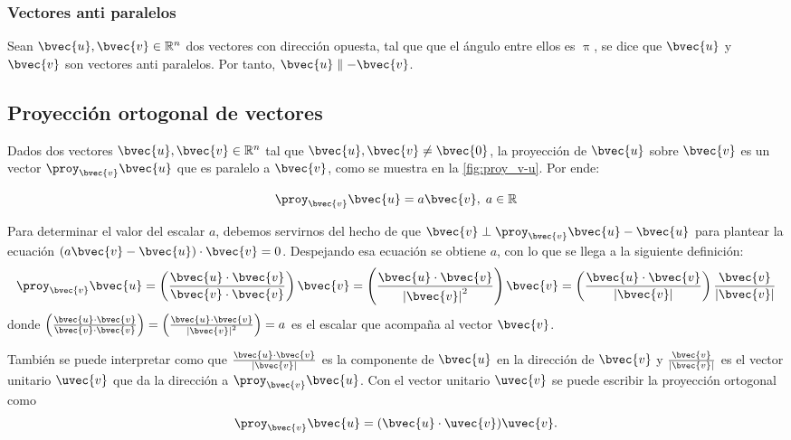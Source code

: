 \documentclass{fmbnotes}
\begin{document}
\subsubsection{ Vectores anti paralelos}

Sean \( \bvec{u}, \bvec{v} \in \mathbb{R}^{n} \) dos vectores con dirección opuesta, tal que que el ángulo entre ellos es \( \uppi \), se dice que \( \bvec{u} \) y \( \bvec{v} \) son vectores anti paralelos. Por tanto, \( \bvec{u} \parallel -\bvec{v} \).

\subsection{ Proyección ortogonal de vectores}

Dados dos vectores \( \bvec{u}, \bvec{v} \in \mathbb{R}^{n} \) tal que \( \bvec{u}, \bvec{v} \neq \bvec{0} \), la proyección de \( \bvec{u} \) sobre \( \bvec{v} \) es un vector \( \proy_{\bvec{v}} \bvec{u} \) que es paralelo a \( \bvec{v} \), como se muestra en la \autoref{fig:proy_v-u}. Por ende:

\[ \proy_{\bvec{v}} \bvec{u}=a \bvec{v}, \; a \in \mathbb{R} \]

Para determinar el valor del escalar \( a \), debemos servirnos del hecho de que \( \bvec{v} \perp \proy_{\bvec{v}} \bvec{u}-\bvec{u} \) para plantear la ecuación \( (a \bvec{v}-\bvec{u}) \cdot \bvec{v}=0 \). Despejando esa ecuación se obtiene \( a \), con lo que se llega a la siguiente definición:
\[ \proy_{\bvec{v}} \bvec{u}=\left(\frac{\bvec{u} \cdot \bvec{v}}{\bvec{v} \cdot \bvec{v}}\right) \bvec{v} = \left(\frac{\bvec{u} \cdot \bvec{v}}{\left|\bvec{v}\right|^{2}}\right) \bvec{v} = \left(\frac{\bvec{u} \cdot \bvec{v}}{\left|\bvec{v}\right|}\right) \frac{\bvec{v}}{\left|\bvec{v}\right|}\]
donde \(\left(\frac{\bvec{u} \cdot \bvec{v}}{\bvec{v}\cdot\bvec{v}}\right)=\left(\frac{\bvec{u} \cdot \bvec{v}}{\left|\bvec{v}\right|^{2}}\right)=a\) es el escalar que acompaña al vector \(\bvec{v}\). 

También se puede interpretar como que \( \frac{\bvec{u} \cdot \bvec{v}}{\left|\bvec{v}\right|} \) es la componente de \( \bvec{u} \) en la dirección de \( \bvec{v} \) y \( \frac{\bvec{v}}{\left|\bvec{v}\right|} \) es el vector unitario \(\uvec{v}\) que da la dirección a \(\proy_{\bvec{v}} \bvec{u} \). Con el vector unitario \(\uvec{v}\) se puede escribir la proyección ortogonal como
\begin{equation*}
	\proy_{\bvec{v}} \bvec{u} = (\bvec{u} \cdot \uvec{v}) \uvec{v}.
\end{equation*}
\end{document}
